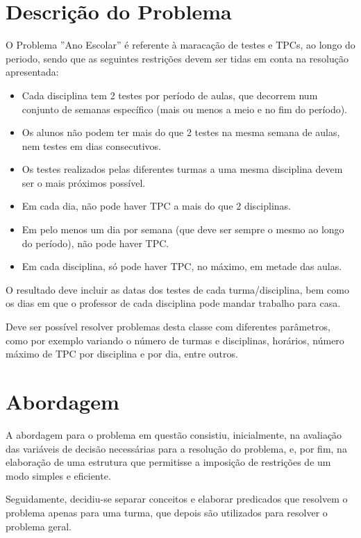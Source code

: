 \documentclass{llncs}
\begin{document}
\newpage
\section{Descrição do Problema}
%

O Problema ''Ano Escolar'' é referente à maracação de testes e TPCs, ao longo do periodo, sendo que as seguintes restrições devem ser tidas em conta na resolução apresentada:

	\begin{itemize}
	\item Cada disciplina tem 2 testes por período de aulas, que decorrem num conjunto de semanas específico (mais ou menos a meio e no fim do período). 	
	\item Os alunos não podem ter mais do que 2 testes na mesma semana de aulas, nem testes em dias consecutivos.
	\item Os testes realizados pelas diferentes turmas a uma mesma disciplina devem ser o mais próximos possível.
	\item Em cada dia, não pode haver TPC a mais do que 2 disciplinas.
	\item Em pelo menos um dia por semana (que deve ser sempre o mesmo ao longo do
	  período), não pode haver TPC. 
	\item Em cada disciplina, só pode haver TPC, no máximo, em metade das aulas.
	\end{itemize}
O resultado deve incluir as datas dos testes de cada turma/disciplina, bem como os dias em que o professor de cada disciplina pode mandar trabalho para casa.\par
Deve ser possível resolver problemas desta classe com diferentes parâmetros, como por exemplo variando o número de turmas e disciplinas, horários, número máximo de TPC por disciplina e por dia, entre outros.

\section{Abordagem}
%
A abordagem para o problema em questão consistiu, inicialmente, na avaliação das variáveis de decisão necessárias para a resolução do problema, e, por fim, na elaboração de uma estrutura que permitisse a imposição de restrições de um modo simples e eficiente.\par
Seguidamente, decidiu-se separar conceitos e elaborar predicados que resolvem o problema apenas para uma turma, que depois são utilizados para resolver o problema geral.


\newpage
\end{document}
